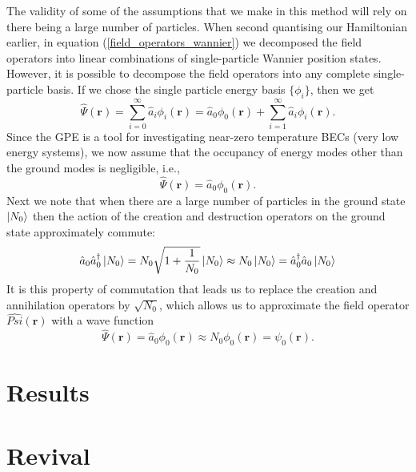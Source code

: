 \documentclass[a4paper, 10pt]{article}
\theoremstyle{plain}
\begin{document}
The validity of some of the assumptions that we make in this
method will rely on there being a large number of particles. When second
quantising our Hamiltonian earlier, in equation (\ref{field_operators_wannier})
we decomposed the field operators into linear combinations of single-particle
Wannier position states. However, it is possible to decompose the field
operators into any complete single-particle basis. If we chose the single
particle energy basis $\{\phi_i\}$, then we get
\begin{equation}
    \hat{\Psi}(\mathbf{r})
    =
    \sum_{i=0}^{\infty}{\hat{a}_i\phi_{i}(\mathbf{r})}
    =
    \hat{a}_{0} \phi_{0}(\mathbf{r}) +
    \sum_{i=1}^{\infty}{\hat{a}_i\phi_{i}(\mathbf{r})}.
\end{equation}
Since the GPE is a tool for investigating near-zero temperature BECs (very low
energy systems), we now assume that the occupancy of energy modes other than
the ground modes is negligible, i.e.,
\begin{equation}
 \hat{\Psi}(\mathbf{r})=\hat{a}_0\phi_{0}(\mathbf{r}).
\end{equation}
Next we note that when there are a large number of particles in the ground
state $\ket{N_0}$ then the action of the creation and destruction operators
on the ground state approximately commute:
\begin{equation}
 \hat{a}_0\hat{a}^\dagger_0\ket{N_0}
 =
 N_0 \sqrt{1+\frac{1}{N_0}}\ket{N_0}
 \approx
 N_0\ket{N_0}
 =
 \hat{a}^\dagger_0\hat{a}_0\ket{N_0}
\end{equation}
It is this property of commutation that leads us to replace the creation and
annihilation operators by $\sqrt{N_0}$, which allows us to approximate the
field operator $\hat{Psi}(\mathbf{r})$ with a wave function
\begin{equation}
    \hat{\Psi}(\mathbf{r})
    =
    \hat{a}_{0} \phi_{0}(\mathbf{r}) \approx N_{0} \phi_{0}(\mathbf{r})
    =
    \psi_{0}(\mathbf{r}).
\end{equation}



\section{Results}

\section{Revival \label{revival}}
\end{document}
